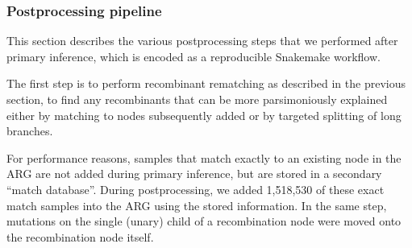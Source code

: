 \documentclass[12pt]{article}
\begin{document}

\subsubsection*{Postprocessing pipeline}
\label{sec:arg_postprocessing}
This section describes the various postprocessing steps that
we performed after primary inference,
which is encoded as a reproducible Snakemake
workflow. %

The first step is to perform recombinant rematching as described in the previous
section, to find any recombinants that can be more parsimoniously explained
either by matching to nodes subsequently added or by targeted
splitting of long branches.

For performance reasons, samples that match exactly to an existing
node in the ARG are not added during primary inference, but are
stored in a secondary ``match database''.
During postprocessing, we added 1,518,530 of these exact match samples
into the ARG using the stored information.
In the same step, mutations on the single (unary) child of a
recombination node were moved onto the recombination node itself.
\end{document}
